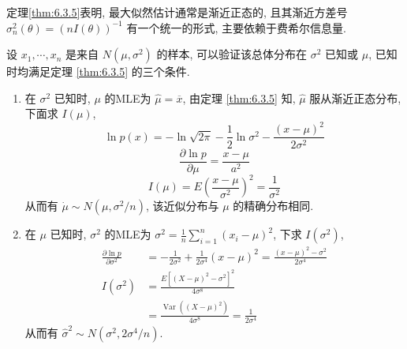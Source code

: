 定理\ref{thm:6.3.5}表明, 最大似然估计通常是渐近正态的, 且其渐近方差号 $\sigma_{n}^{2}(\theta)=(n I(\theta))^{-1}$ 有一个统一的形式, 主要依赖于费希尔信息量.

\begin{example}\label{exam:6.3.8}
设 $x_{1}, \cdots, x_{n}$ 是来自 $N\left(\mu, \sigma^{2}\right)$ 的样本, 可以验证该总体分布在 $\sigma^2$ 已知或 $\mu$, 已知时均满足定理 \ref{thm:6.3.5} 的三个条件.
\begin{enumerate}
\item 在 $\sigma^2$ 已知时, $\mu$ 的MLE为 $\hat{\mu}=\overline{x}$, 由定理 \ref{thm:6.3.5} 知, $\hat{\mu}$ 服从渐近正态分布, 下面求 $I(\mu)$,
\[\ln p(x)=-\ln \sqrt{2 \pi}-\frac{1}{2} \ln \sigma^{2}-\frac{(x-\mu)^{2}}{2 \sigma^{2}}\]
\[\frac{\partial \ln p}{\partial \mu}=\frac{x-\mu}{a^{2}}\]
\[I(\mu)=E\left(\frac{x-\mu}{\sigma^{2}}\right)^{2}=\frac{1}{\sigma^{2}}\]
从而有 $\dot{\mu} \sim N\left(\mu, \sigma^{2} / n\right)$, 该近似分布与 $\mu$ 的精确分布相同.
\item 在 $\mu$ 已知时, $\sigma^2$ 的MLE为 $\sigma^{2}=\frac{1}{n} \sum_{i=1}^{n}\left(x_{i}-\mu\right)^{2}$, 下求 $I(\sigma^2)$,
\begin{align*} \frac{\partial \ln p}{\partial \sigma^{2}} &=-\frac{1}{2 \sigma^{2}}+\frac{1}{2 \sigma^{4}}(x-\mu)^{2}=\frac{(x-\mu)^{2}-\sigma^{2}}{2 \sigma^{4}} \\ I\left(\sigma^{2}\right) &=\frac{E\left[(X-\mu)^{2}-\sigma^{2}\right]^{2}}{4 \sigma^{8}} \\ &=\frac{\operatorname{Var}\left((X-\mu)^{2}\right)}{4 \sigma^{8}}=\frac{1}{2 \sigma^{4}} \end{align*}
从而有 $\hat{\sigma}^{2} \sim N\left(\sigma^{2}, 2 \sigma^{4} / n\right)$.
\end{enumerate}
\end{example}


